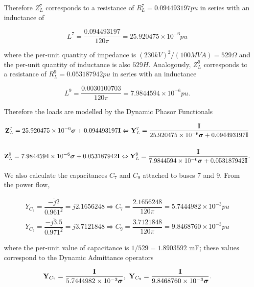 	Therefore $Z_{L}^7$ corresponds to a resistance of $R_L^7 = 0.094493197pu$ in series with an inductance of

\begin{equation} L^7 = \dfrac{0.094493197}{120\pi} = 25.920475\times 10^{-6} pu \end{equation}

	\noindent  where the per-unit quantity of impedance is $(230kV)^2/(100MVA) = 529\Omega$ and the per-unit quantity of inductance is also $529H$. Analogously, $Z_{L}^9$ corresponds to a resistance of $R_L^9 = 0.053187942pu$ in series with an inductance

\begin{equation} L^9 = \dfrac{0.0030100703}{120\pi} = 7.9844594\times 10^{-6} pu .\end{equation}

	Therefore the loads are modelled by the Dynamic Phasor Functionals

\footnotesize
\begin{gather}
	\mathbf{Z}_{L}^7 = 25.920475\times 10^{-6}\boldsymbol{\sigma} + 0.094493197\mathbf{I} \Leftrightarrow \mathbf{Y}_{L}^7 = \dfrac{\mathbf{I}}{25.920475\times 10^{-6}\boldsymbol{\sigma} + 0.094493197\mathbf{I}}\\[5mm]
	\mathbf{Z}_{L}^9 = 7.9844594\times 10^{-6}\boldsymbol{\sigma} + 0.053187942\mathbf{I} \Leftrightarrow \mathbf{Y}_{L}^9 = \dfrac{\mathbf{I}}{7.9844594\times 10^{-6}\boldsymbol{\sigma} + 0.053187942\mathbf{I}}.
\end{gather}
\normalsize

	We also calculate the capacitances $C_7$ and $C_9$ attached to buses 7 and 9. From the power flow,

\begin{gather}
	Y_{C_7} = \dfrac{\overline{-j2}}{0.961^2} = j2.1656248 \Rightarrow C_7 = \dfrac{2.1656248}{120\pi} = 5.7444982\times 10^{-3} pu \\
	Y_{C_9} = \dfrac{\overline{-j3.5}}{0.971^2} = j3.7121848 \Rightarrow C_9 = \dfrac{3.7121848}{120\pi} = 9.8468760\times 10^{-3} pu
\end{gather}

	\noindent where the per-unit value of capacitance is $1/529 = 1.8903592$ mF; these values correspond to the Dynamic Admittance operators

\begin{equation} \mathbf{Y}_{C_7} = \dfrac{\mathbf{I}}{5.7444982\times 10^{-3}\boldsymbol{\sigma}},\ \mathbf{Y}_{C_9} = \dfrac{\mathbf{I}}{9.8468760\times 10^{-3}\boldsymbol{\sigma}} .\end{equation}

